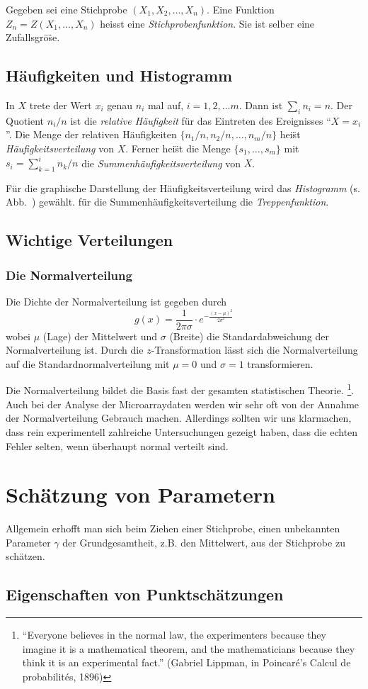 Gegeben sei eine Stichprobe $(X_1,X_2,\ldots,X_n)$. Eine Funktion $Z_n=Z(X_1,\ldots,X_n)$ heisst eine {\em Stichprobenfunktion}. Sie ist selber eine Zufallsgr\"o\"se.

\subsection{H\"aufigkeiten und Histogramm}
In $X$ trete der Wert $x_i$ genau $n_i$ mal auf, $i=1,2,\ldots m$. Dann ist $\sum_i n_i = n$. Der Quotient $n_i/n$ ist die {\em relative H\"aufigkeit} f\"ur das Eintreten des Ereignisses ``$X=x_i$''.
Die Menge der relativen H\"aufigkeiten $\{n_1/n,n_2/n,\ldots, n_m/n\}$ hei\"st {\em H\"aufigkeitsverteilung} von $X$. Ferner hei\"st die Menge $\{s_1,\ldots,s_m\}$ mit $s_i=\sum_{k=1}^{i}n_k/n$ die {\em Summenh\"aufigkeitsverteilung} von $X$.

F\"ur die graphische Darstellung der H\"aufigkeitsverteilung wird das {\em Histogramm} (s. Abb.~) gew\"ahlt. f\"ur die Summenh\"aufigkeitsverteilung die {\em Treppenfunktion}.

%
\subsection{Wichtige Verteilungen}

\subsubsection{Die Normalverteilung}
Die Dichte der Normalverteilung ist gegeben durch
\begin{equation}\label{dichtenormal}
g(x) = \frac{1}{2\pi\sigma}\cdot e^{-\frac{(x-\mu)^2}{2\sigma^2}}
\end{equation}
wobei $\mu$ (Lage) der Mittelwert und $\sigma$ (Breite) die Standardabweichung der Normalverteilung ist. 
Durch die $z$-Transformation l\"asst sich die Normalverteilung auf die Standardnormalverteilung mit $\mu=0$ und $\sigma=1$ transformieren.

Die Normalverteilung bildet die Basis fast der gesamten statistischen Theorie. \footnote{ 
``Everyone believes in the normal law, the experimenters because they imagine it is a mathematical theorem, and the mathematicians because they think it is an experimental fact.'' (Gabriel Lippman, in Poincar\'e's Calcul de probabilit\'es, 1896)}. Auch bei der Analyse der Microarraydaten werden wir sehr oft von der Annahme der Normalverteilung Gebrauch machen. Allerdings sollten wir uns klarmachen, dass  rein experimentell zahlreiche Untersuchungen gezeigt haben, dass die echten Fehler selten, wenn \"uberhaupt normal verteilt sind.


\section{Sch\"atzung von Parametern}
Allgemein erhofft man sich beim Ziehen einer Stichprobe, einen unbekannten Parameter $\gamma$ der Grundgesamtheit, z.B. den Mittelwert, aus der Stichprobe zu sch\"atzen.
\subsection{Eigenschaften von Punktsch\"atzungen}

